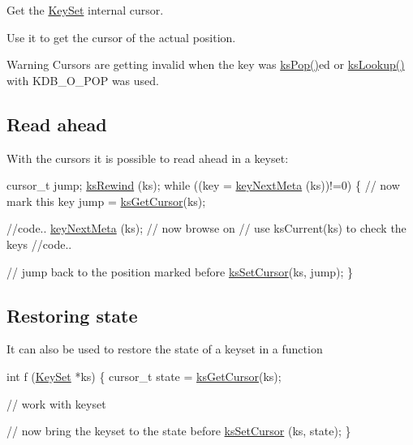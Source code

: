 Get the \hyperlink{classkdb_1_1KeySet}{Key\+Set} internal cursor. 

Use it to get the cursor of the actual position.

\begin{DoxyWarning}{Warning}
Cursors are getting invalid when the key was \hyperlink{group__keyset_gae42530b04defb772059de0600159cf69}{ks\+Pop()}ed or \hyperlink{group__keyset_gaa34fc43a081e6b01e4120daa6c112004}{ks\+Lookup()} with K\+D\+B\+\_\+\+O\+\_\+\+P\+O\+P was used.
\end{DoxyWarning}
\hypertarget{group__keyset_readahead}{}\subsection{Read ahead}\label{group__keyset_readahead}
With the cursors it is possible to read ahead in a keyset\+:


\begin{DoxyCode}
cursor\_t jump;
\hyperlink{group__keyset_gabe793ff51f1728e3429c84a8a9086b70}{ksRewind} (ks);
\textcolor{keywordflow}{while} ((key = \hyperlink{group__keymeta_ga4c88342f580a4291455a801af71ce048}{keyNextMeta} (ks))!=0)
\{
        \textcolor{comment}{// now mark this key}
        jump = \hyperlink{group__keyset_gaffe507ab9281c322eb16c3e992075d29}{ksGetCursor}(ks);

        \textcolor{comment}{//code..}
        \hyperlink{group__keymeta_ga4c88342f580a4291455a801af71ce048}{keyNextMeta} (ks); \textcolor{comment}{// now browse on}
        \textcolor{comment}{// use ksCurrent(ks) to check the keys}
        \textcolor{comment}{//code..}

        \textcolor{comment}{// jump back to the position marked before}
        \hyperlink{group__keyset_gad94c9ffaa3e8034564c0712fd407c345}{ksSetCursor}(ks, jump);
\}
\end{DoxyCode}
\hypertarget{group__keyset_restore}{}\subsection{Restoring state}\label{group__keyset_restore}
It can also be used to restore the state of a keyset in a function


\begin{DoxyCode}
\textcolor{keywordtype}{int} f (\hyperlink{classkdb_1_1KeySet_a4eac9850fa4f06c07a5306befc3e4377}{KeySet} *ks)
\{
        cursor\_t state = \hyperlink{group__keyset_gaffe507ab9281c322eb16c3e992075d29}{ksGetCursor}(ks);

        \textcolor{comment}{// work with keyset}

        \textcolor{comment}{// now bring the keyset to the state before}
        \hyperlink{group__keyset_gad94c9ffaa3e8034564c0712fd407c345}{ksSetCursor} (ks, state);
\}
\end{DoxyCode}


